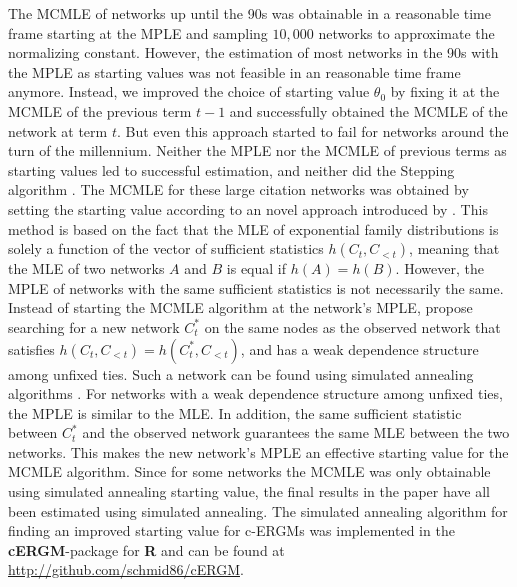 \documentclass{cup-pan}
\begin{document}
The MCMLE of networks up until the 90s was obtainable in a reasonable time frame starting at the MPLE and sampling $10,000$ networks to approximate the normalizing constant. However, the estimation of most networks in the 90s with the MPLE as starting values was not feasible in an reasonable time frame anymore. Instead, we improved the choice of starting value $\theta_0$ by fixing it at the MCMLE of the previous term $t-1$ and successfully obtained the MCMLE of the network at term $t$. But even this approach started to fail for networks around the turn of the millennium. Neither the MPLE nor the MCMLE of previous terms as starting values led to successful estimation, and neither did the Stepping algorithm \citep{hummel2012improving}. 
The MCMLE for these large citation networks was obtained by setting the starting value according to an novel approach introduced by \citet{SchmidHunter2020}. This method is based on the fact that the MLE of exponential family distributions is solely a function of the vector of sufficient statistics $h(C_t, C_{<t})$, meaning that the MLE of two networks $A$ and $B$ is equal if $h(A)=h(B)$. However, the MPLE of networks with the same sufficient statistics is not necessarily the same. Instead of starting the MCMLE algorithm at the network's MPLE, \citet{SchmidHunter2020} propose searching for a new network $C_t^*$ on the same nodes as the observed network that satisfies $h(C_t, C_{<t}) = h(C_t^*, C_{<t})$, and has a weak dependence structure among unfixed ties. Such a network can be found using simulated annealing algorithms \citep{Kirkpatrick83}. For networks with a weak dependence structure among unfixed ties, the MPLE is similar to the MLE. In addition, the same sufficient statistic between $C_t^*$ and the observed network guarantees the same MLE between the two networks. This makes the new network's MPLE an effective starting value for the MCMLE algorithm. Since for some networks the MCMLE was only obtainable using simulated annealing starting value, the final results in the paper have all been estimated using simulated annealing.
The simulated annealing algorithm for finding an improved starting value for c-ERGMs was implemented in the \textbf{cERGM}-package for \textbf{R} \citep{RCore} and can be found at \url{http://github.com/schmid86/cERGM}.
\end{document}
